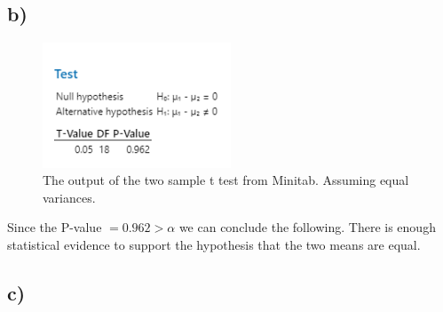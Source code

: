 \documentclass{article}
\begin{document}
\subsection*{b)}
\begin{figure}[h]
    \centering
    \includegraphics[width=0.5\textwidth]{./images/3_b.png}
    \caption{The output of the two sample t test from Minitab. Assuming equal variances.}
    \label{fig:3_a}
  \end{figure}
  Since the P-value $= 0.962 > \alpha$ we can conclude the following.
  There is enough statistical evidence to support the hypothesis that the two means are equal.

  \clearpage
  \subsection*{c)}
\end{document}

